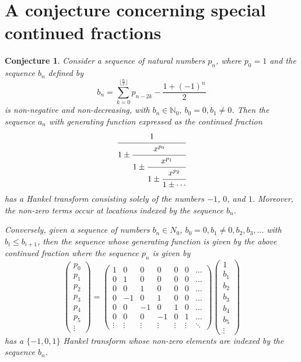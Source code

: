 \documentclass[12pt,reqno]{article}
\newtheorem{conjecture}[theorem]{Conjecture}
\theoremstyle{definition}
\begin{document}
\section{A conjecture concerning special continued fractions}

\begin{conjecture} Consider a sequence of natural numbers  $p_n$, where $p_0=1$ and the sequence $b_n$ defined by
 \begin{equation}\label{b_seq} b_n=\sum_{k=0}^{\lfloor \frac{n}{2} \rfloor} p_{n-2k} - \frac{1+(-1)^n}{2} \end{equation} is non-negative and non-decreasing, with $b_n \in \mathbb{N}_0$,  $b_0=0,b_1 \ne 0$.   Then the sequence $a_n$ with generating function expressed as the continued fraction
$$\cfrac{1}{1\pm
\cfrac{x^{p_0}}{1\pm
\cfrac{x^{p_1}}{1\pm
\cfrac{x^{p_2}}{1\pm \cdots}}}}$$
has a Hankel transform consisting solely of the numbers $-1$, $0$, and $1$. Moreover, the non-zero terms occur at locations indexed by the sequence $b_n$.


Conversely, given a sequence of numbers $b_n \in N_0$,  $b_0=0,b_1 \ne 0, b_2, b_3,\ldots$ with $b_i \le b_{i+1}$, then the sequence whose generating function is given by the above continued fraction where the sequence $p_n$ is given by
\begin{displaymath}
\left(\begin{array}{c} p_0 \\ p_1 \\p_2\\ p_3 \\p_4 \\p_5 \\ \vdots \end{array}\right)=
\left(\begin{array}{ccccccc}1 & 0 & 0 & 0 & 0 & 0 & \ldots \\
                            0 & 1 & 0 & 0 & 0 & 0 & \ldots \\
                            0 & 0 & 1 & 0& 0 & 0 & \ldots \\
                            0 & -1 & 0 & 1 & 0 & 0 & \ldots \\
                            0 & 0 & -1&  0 & 1 & 0 & \ldots \\
                            0 & 0  & 0 & -1 & 0 & 1 &\ldots\\ \vdots
& \vdots &
\vdots & \vdots & \vdots & \vdots &
\ddots\end{array}\right)\left(\begin{array}{c} 1 \\ b_1 \\b_2\\ b_3 \\b_4 \\b_5 \\ \vdots \end{array}\right)\end{displaymath}
has a $\{-1,0,1\}$ Hankel transform whose non-zero elements are indexed by the sequence $b_n$.
\end{conjecture}
\end{document}
